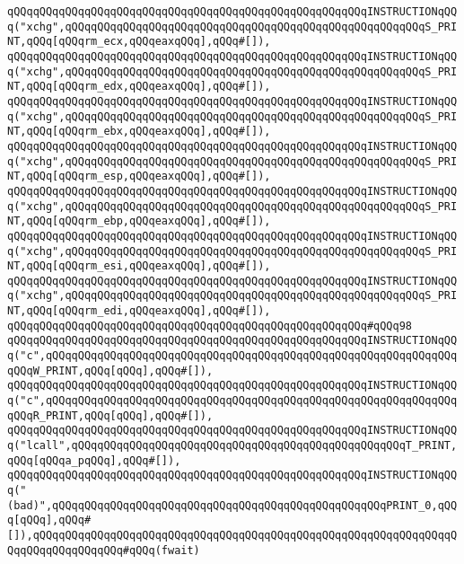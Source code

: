 \verb|qQQqqQQqqQQqqQQqqQQqqQQqqQQqqQQqqQQqqQQqqQQqqQQqqQQqqQQqINSTRUCTIONqQQq("xchg",qQQqqQQqqQQqqQQqqQQqqQQqqQQqqQQqqQQqqQQqqQQqqQQqqQQqqQQqS_PRINT,qQQq[qQQqrm_ecx,qQQqeaxqQQq],qQQq#[]),|\newline
\verb|qQQqqQQqqQQqqQQqqQQqqQQqqQQqqQQqqQQqqQQqqQQqqQQqqQQqqQQqINSTRUCTIONqQQq("xchg",qQQqqQQqqQQqqQQqqQQqqQQqqQQqqQQqqQQqqQQqqQQqqQQqqQQqqQQqS_PRINT,qQQq[qQQqrm_edx,qQQqeaxqQQq],qQQq#[]),|\newline
\verb|qQQqqQQqqQQqqQQqqQQqqQQqqQQqqQQqqQQqqQQqqQQqqQQqqQQqqQQqINSTRUCTIONqQQq("xchg",qQQqqQQqqQQqqQQqqQQqqQQqqQQqqQQqqQQqqQQqqQQqqQQqqQQqqQQqS_PRINT,qQQq[qQQqrm_ebx,qQQqeaxqQQq],qQQq#[]),|\newline
\verb|qQQqqQQqqQQqqQQqqQQqqQQqqQQqqQQqqQQqqQQqqQQqqQQqqQQqqQQqINSTRUCTIONqQQq("xchg",qQQqqQQqqQQqqQQqqQQqqQQqqQQqqQQqqQQqqQQqqQQqqQQqqQQqqQQqS_PRINT,qQQq[qQQqrm_esp,qQQqeaxqQQq],qQQq#[]),|\newline
\verb|qQQqqQQqqQQqqQQqqQQqqQQqqQQqqQQqqQQqqQQqqQQqqQQqqQQqqQQqINSTRUCTIONqQQq("xchg",qQQqqQQqqQQqqQQqqQQqqQQqqQQqqQQqqQQqqQQqqQQqqQQqqQQqqQQqS_PRINT,qQQq[qQQqrm_ebp,qQQqeaxqQQq],qQQq#[]),|\newline
\verb|qQQqqQQqqQQqqQQqqQQqqQQqqQQqqQQqqQQqqQQqqQQqqQQqqQQqqQQqINSTRUCTIONqQQq("xchg",qQQqqQQqqQQqqQQqqQQqqQQqqQQqqQQqqQQqqQQqqQQqqQQqqQQqqQQqS_PRINT,qQQq[qQQqrm_esi,qQQqeaxqQQq],qQQq#[]),|\newline
\verb|qQQqqQQqqQQqqQQqqQQqqQQqqQQqqQQqqQQqqQQqqQQqqQQqqQQqqQQqINSTRUCTIONqQQq("xchg",qQQqqQQqqQQqqQQqqQQqqQQqqQQqqQQqqQQqqQQqqQQqqQQqqQQqqQQqS_PRINT,qQQq[qQQqrm_edi,qQQqeaxqQQq],qQQq#[]),|\newline
\verb|qQQqqQQqqQQqqQQqqQQqqQQqqQQqqQQqqQQqqQQqqQQqqQQqqQQqqQQq#qQQq98|\newline
\verb|qQQqqQQqqQQqqQQqqQQqqQQqqQQqqQQqqQQqqQQqqQQqqQQqqQQqqQQqINSTRUCTIONqQQq("c",qQQqqQQqqQQqqQQqqQQqqQQqqQQqqQQqqQQqqQQqqQQqqQQqqQQqqQQqqQQqqQQqqQQqW_PRINT,qQQq[qQQq],qQQq#[]),|\newline
\verb|qQQqqQQqqQQqqQQqqQQqqQQqqQQqqQQqqQQqqQQqqQQqqQQqqQQqqQQqINSTRUCTIONqQQq("c",qQQqqQQqqQQqqQQqqQQqqQQqqQQqqQQqqQQqqQQqqQQqqQQqqQQqqQQqqQQqqQQqqQQqR_PRINT,qQQq[qQQq],qQQq#[]),|\newline
\verb|qQQqqQQqqQQqqQQqqQQqqQQqqQQqqQQqqQQqqQQqqQQqqQQqqQQqqQQqINSTRUCTIONqQQq("lcall",qQQqqQQqqQQqqQQqqQQqqQQqqQQqqQQqqQQqqQQqqQQqqQQqqQQqT_PRINT,qQQq[qQQqa_pqQQq],qQQq#[]),|\newline
\verb|qQQqqQQqqQQqqQQqqQQqqQQqqQQqqQQqqQQqqQQqqQQqqQQqqQQqqQQqINSTRUCTIONqQQq("(bad)",qQQqqQQqqQQqqQQqqQQqqQQqqQQqqQQqqQQqqQQqqQQqqQQqqQQqPRINT_0,qQQq[qQQq],qQQq#[]),qQQqqQQqqQQqqQQqqQQqqQQqqQQqqQQqqQQqqQQqqQQqqQQqqQQqqQQqqQQqqQQqqQQqqQQqqQQqqQQqqQQq#qQQq(fwait)|\newline
